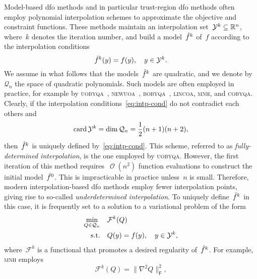 \documentclass[draft]{article}
\numberwithin{equation}{section}
\theoremstyle{definition}
\DeclareMathOperator{\bigo}{\mathcal{O}}
\DeclareMathOperator{\card}{card}
\newcommand{\norm}[2][]{#1\lVert#2#1\rVert}
\newcommand{\obj}{f}
\newcommand{\objm}[1][]{\hat{\obj}\ifblank{#1}{}{^{#1}}}
\newcommand{\qpoly}{\mathcal{Q}_n}
\newcommand{\R}{\mathbb{R}}
\newcommand{\solvername}[1]{\textsc{#1}\xspace}
\newcommand{\xpt}[1][]{\mathcal{Y}\ifblank{#1}{}{^{#1}}}
\begin{document}
Model-based \gls{dfo} methods and in particular trust-region \gls{dfo} methods often employ polynomial interpolation schemes to approximate the objective and constraint functions.
These methods maintain an interpolation set~$\xpt[k] \subseteq \R^n$, where~$k$ denotes the iteration number, and build a model~$\objm[k]$ of~$\obj$ according to the interpolation conditions
\begin{equation}
    \label{eq:intp-cond}
    \objm[k](y) = \obj(y), \quad y \in \xpt[k].
\end{equation}
We assume in what follows that the models~$\objm[k]$ are quadratic, and we denote by~$\qpoly$ the space of quadratic polynomials.
Such models are often employed in practice, for example by \solvername{uobyqa}~\cite{Powell_2002}, \solvername{newuoa}~\cite{Powell_2006}, \solvername{bobyqa}~\cite{Powell_2009}, \solvername{lincoa}, \solvername{mnh}, and \solvername{cobyqa}.
Clearly, if the interpolation conditions~\eqref{eq:intp-cond} do not contradict each others and
\begin{equation*}
    \card\xpt[k] = \dim\qpoly = \frac{1}{2} (n + 1) (n + 2),
\end{equation*}
then~$\objm[k]$ is uniquely defined by~\eqref{eq:intp-cond}.
This scheme, referred to as \emph{fully-determined interpolation}, is the one employed by \solvername{uobyqa}.
However, the first iteration of this method requires~$\bigo(n^2)$ function evaluations to construct the initial model~$\objm[0]$.
This is impracticable in practice unless~$n$ is small.
Therefore, modern interpolation-based \gls{dfo} methods employ fewer interpolation points, giving rise to so-called \emph{underdetermined interpolation}.
To uniquely define~$\objm[k]$ in this case, it is frequently set to a solution to a variational problem of the form
\begin{equation}
    \label{eq:intp-var}
    \begin{aligned}
        \min_{Q \in \qpoly} & \quad \mathcal{F}^k(Q)\\
        \text{s.t.}         & \quad Q(y) = \obj(y), \quad y \in \xpt[k],
    \end{aligned}
\end{equation}
where~$\mathcal{F}^k$ is a functional that promotes a desired regularity of~$\objm[k]$.
For example, \solvername{mnh} employs
\begin{equation}
    \label{eq:mnh}
    \mathcal{F}^k(Q) = \norm[\big]{\nabla^2 Q}_{\mathsf{F}}^2,
\end{equation}
\end{document}
